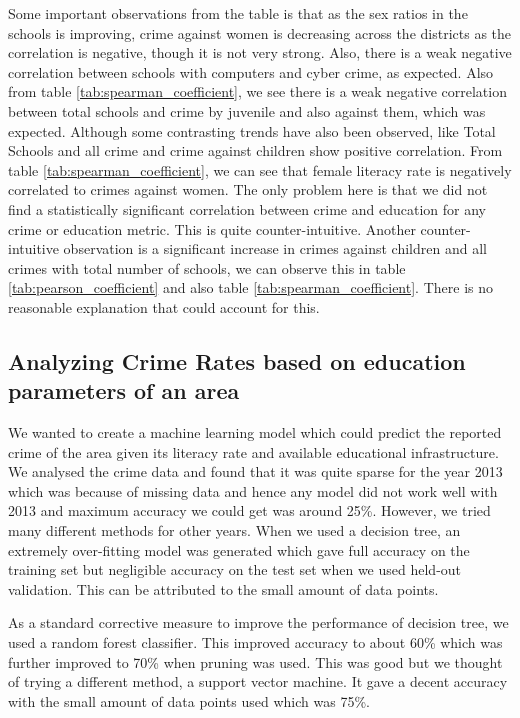 \documentclass[twoside]{article}
\begin{document}
Some important observations from the table is that as the sex ratios in the schools is improving, crime against women is decreasing across the districts as the correlation is negative, though it is not very strong. Also, there is a weak negative correlation between schools with computers and cyber crime, as expected. Also from table \ref{tab:spearman_coefficient}, we see there is a weak negative correlation between total schools and crime by juvenile and also against them, which was expected. Although some contrasting trends have also been observed, like Total Schools and all crime and crime against children show positive correlation. From table \ref{tab:spearman_coefficient}, we can see that female literacy rate is negatively correlated to crimes against women. The only problem here is that we did not find a statistically significant correlation between crime and education for any crime or education metric. This is quite counter-intuitive. Another counter-intuitive observation is a significant increase in crimes against children and all crimes with total number of schools, we can observe this in table \ref{tab:pearson_coefficient} and also table \ref{tab:spearman_coefficient}. There is no reasonable explanation that could account for this.\\

\subsection*{Analyzing Crime Rates based on education parameters of an area}
We wanted to create a machine learning model which could predict the reported crime of the area given its literacy rate and available educational infrastructure. We analysed the crime data and found that it was quite sparse for the year 2013 which was because of missing data and hence any model did not work well with 2013 and maximum accuracy we could get was around 25\%. However, we tried many different methods for other years. When we used a decision tree, an extremely over-fitting model was generated which gave full accuracy on the training set but negligible accuracy on the test set when we used held-out validation. This can be attributed to the small amount of data points.

As a standard corrective measure to improve the performance of decision tree, we used a random forest classifier. This improved accuracy to about 60\% which was further improved to 70\% when pruning was used. This was good but we thought of trying a different method, a support vector machine. It gave a decent accuracy with the small amount of data points used which was 75\%.  
\end{document}
